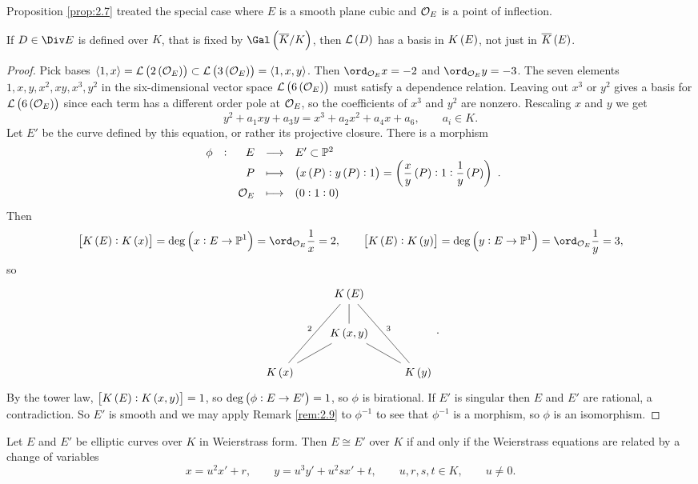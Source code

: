 \begin{remark*}
Proposition \ref{prop:2.7} treated the special case where $ E $ is a smooth plane cubic and $ \mathcal{O}_E $ is a point of inflection.
\end{remark*}

\begin{fact*}
If $ D \in \Div E $ is defined over $ K $, that is fixed by $ \Gal\br{\overline{K} / K} $, then $ \LLL\br{D} $ has a basis in $ K\br{E} $, not just in $ \overline{K}\br{E} $.
\end{fact*}

\begin{proof}
Pick bases $ \abr{1, x} = \LLL\br{2\br{\OOO_E}} \subset \LLL\br{3\br{\OOO_E}} = \abr{1, x, y} $. Then $ \ord_{\OOO_E} x = -2 $ and $ \ord_{\OOO_E} y = -3 $. The seven elements $ 1, x, y, x^2, xy, x^3, y^2 $ in the six-dimensional vector space $ \LLL\br{6\br{\OOO_E}} $ must satisfy a dependence relation. Leaving out $ x^3 $ or $ y^2 $ gives a basis for $ \LLL\br{6\br{\OOO_E}} $ since each term has a different order pole at $ \mathcal{O}_E $, so the coefficients of $ x^3 $ and $ y^2 $ are nonzero. Rescaling $ x $ and $ y $ we get
$$ y^2 + a_1xy + a_3y = x^3 + a_2x^2 + a_4x + a_6, \qquad a_i \in K. $$
Let $ E' $ be the curve defined by this equation, or rather its projective closure. There is a morphism
$$ \functions[\phi]{E}{E' \subset \PP^2}{P}{\br{x\br{P} : y\br{P} : 1} = \br{\dfrac{x}{y}\br{P} : 1 : \dfrac{1}{y}\br{P}}}{\OOO_E}{\br{0 : 1 : 0}}. $$
Then
$$ \sbr{K\br{E} : K\br{x}} = \deg \br{x : E \to \PP^1} = \ord_{\OOO_E} \dfrac{1}{x} = 2, \qquad \sbr{K\br{E} : K\br{y}} = \deg \br{y : E \to \PP^1} = \ord_{\OOO_E} \dfrac{1}{y} = 3, $$
so
$$
\begin{tikzcd}
& K\br{E} \arrow[dash]{d} \arrow[dash]{ddl}[swap]{2} \arrow[dash]{ddr}{3} & \\
& K\br{x, y} \arrow[dash]{dl} \arrow[dash]{dr} & \\
K\br{x} & & K\br{y}
\end{tikzcd}.
$$
By the tower law, $ \sbr{K\br{E} : K\br{x, y}} = 1 $, so $ \deg \br{\phi : E \to E'} = 1 $, so $ \phi $ is birational. If $ E' $ is singular then $ E $ and $ E' $ are rational, a contradiction. So $ E' $ is smooth and we may apply Remark \ref{rem:2.9} to $ \phi^{-1} $ to see that $ \phi^{-1} $ is a morphism, so $ \phi $ is an isomorphism.
\end{proof}


\begin{proposition}
\label{prop:3.2}
Let $ E $ and $ E' $ be elliptic curves over $ K $ in Weierstrass form. Then $ E \cong E' $ over $ K $ if and only if the Weierstrass equations are related by a change of variables
$$ x = u^2x' + r, \qquad y = u^3y' + u^2sx' + t, \qquad u, r, s, t \in K, \qquad u \ne 0. $$
\end{proposition}

